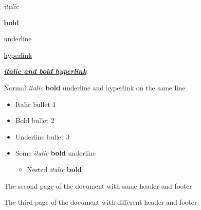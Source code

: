 \documentclass[11pt,a4paper]{article}
\begin{document}
\textit{italic}

\textbf{bold}

underline

\href{https://github.com/DS4SD/docling}{hyperlink}

\href{https://github.com/DS4SD/docling}{\textit{\textbf{italic and bold hyperlink}}}

Normal \textit{italic} \textbf{bold} underline and hyperlink on the same line

\begin{itemize}
\item Italic bullet 1
\item Bold bullet 2
\item Underline bullet 3
\item Some \textit{italic} \textbf{bold} underline
  \begin{itemize}
\item Nested \textit{italic} \textbf{bold}
  \end{itemize}
\end{itemize}

The second page of the document with same header and footer

The third page of the document with different header and footer
\end{document}
